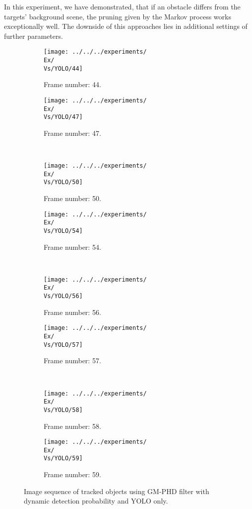 In this experiment, we have demonstrated, that if an obstacle differs from the targets' background scene, the pruning given by the Markov process works exceptionally well. The downside of this approaches lies in additional settings of further parameters.
\begin{figure}[H]
    \centering
    \begin{subfigure}{0.48\textwidth}
        \centering
        \texttt{[image: ../../../experiments/\\Ex/\\Vs/YOLO/44]}
        \caption{Frame number: 44.}
        \label{fig:\Ex-\Vs-\Set:01}
    \end{subfigure}
    \begin{subfigure}{0.48\textwidth}
        \centering
        \texttt{[image: ../../../experiments/\\Ex/\\Vs/YOLO/47]}
        \caption{Frame number: 47.}
        \label{fig:\Ex-\Vs-\Set:02}
    \end{subfigure}
    \\
    \begin{subfigure}{0.48\textwidth}
        \centering
        \texttt{[image: ../../../experiments/\\Ex/\\Vs/YOLO/50]}
        \caption{Frame number: 50.}
        \label{fig:\Ex-\Vs-\Set:03}
    \end{subfigure}
    \begin{subfigure}{0.48\textwidth}
        \centering
        \texttt{[image: ../../../experiments/\\Ex/\\Vs/YOLO/54]}
        \caption{Frame number: 54.}
        \label{fig:\Ex-\Vs-\Set:04}
    \end{subfigure}
    \\
    \begin{subfigure}{0.48\textwidth}
        \centering
        \texttt{[image: ../../../experiments/\\Ex/\\Vs/YOLO/56]}
        \caption{Frame number: 56.}
        \label{fig:\Ex-\Vs-\Set:05}
    \end{subfigure}
    \begin{subfigure}{0.48\textwidth}
        \centering
        \texttt{[image: ../../../experiments/\\Ex/\\Vs/YOLO/57]}
        \caption{Frame number: 57.}
        \label{fig:\Ex-\Vs-\Set:06}
    \end{subfigure}
    \\
    \begin{subfigure}{0.48\textwidth}
        \centering
        \texttt{[image: ../../../experiments/\\Ex/\\Vs/YOLO/58]}
        \caption{Frame number: 58.}
        \label{fig:\Ex-\Vs-\Set:07}
    \end{subfigure}
    \begin{subfigure}{0.48\textwidth}
        \centering
        \texttt{[image: ../../../experiments/\\Ex/\\Vs/YOLO/59]}
        \caption{Frame number: 59.}
        \label{fig:\Ex-\Vs-\Set:08}
    \end{subfigure}
    \caption{Image sequence of tracked objects using GM-PHD filter with dynamic detection probability and YOLO only.}
    \label{fig:\Ex-\Vs-\Set}
\end{figure}

